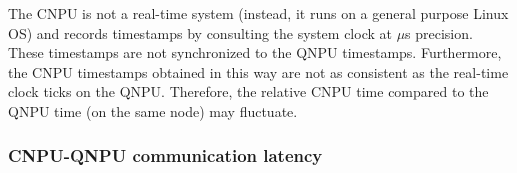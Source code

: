 The \ac{CNPU} is not a real-time system (instead, it runs on a general purpose Linux \ac{OS}) and records timestamps by consulting the system clock at $\mu$s precision. These timestamps are not synchronized to the \ac{QNPU} timestamps. Furthermore, the \ac{CNPU} timestamps obtained in this way are not as consistent as the real-time clock ticks on the \ac{QNPU}. Therefore, the relative \ac{CNPU} time compared to the \ac{QNPU} time (on the same node) may fluctuate.




\subsubsection{CNPU-QNPU communication latency}
\label{qnodeos:sec:cnpu-qnpu-latency-estimation}


